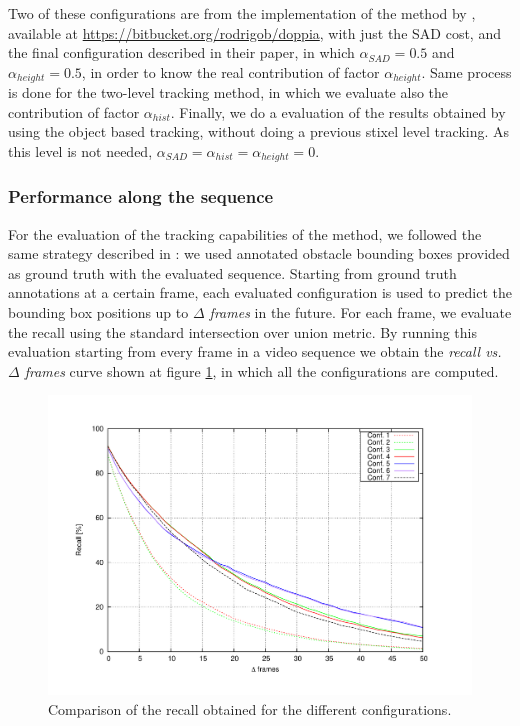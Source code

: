 Two of these configurations are from the implementation of the method by \cite{gunyel2012stixels}, available at \url{https://bitbucket.org/rodrigob/doppia}, with just the \ac{SAD} cost, and the final configuration described in their paper, in which $\alpha_{SAD} = 0.5$ and $\alpha_{height} = 0.5$, in order to know the real contribution of factor $\alpha_{height}$. Same process is done for the two-level tracking method, in which we evaluate also the contribution of factor $\alpha_{hist}$. Finally, we do a evaluation of the results obtained by using the object based tracking, without doing a previous stixel level tracking. As this level is not needed, $\alpha_{SAD} = \alpha_{hist} = \alpha_{height} = 0$.

\subsubsection{Performance along the sequence}\label{ch:chapter04_02_03_01}

For the evaluation of the tracking capabilities of the method, we followed the same strategy described in \cite{gunyel2012stixels}: we used annotated obstacle bounding boxes provided as ground truth with the evaluated sequence. Starting from ground truth annotations at a certain frame, each evaluated configuration is used to predict the bounding box positions up to \emph{$\Delta$ frames} in the future. For each frame, we evaluate the recall using the standard intersection over union metric. By running this evaluation starting from every frame in a video sequence we obtain the \emph{recall vs. $\Delta$ frames} curve shown at figure \ref{fig:cp04_recall_vs_delta_frames}, in which all the configurations are computed. 

\begin{figure}[h!]
\centering
\includegraphics[width=\textwidth,height=0.5\textwidth,trim=50 40 80 60,clip]{recall_vs_delta_frames}
\caption{Comparison of the recall obtained for the different configurations.}\label{fig:cp04_recall_vs_delta_frames}
\end{figure}

